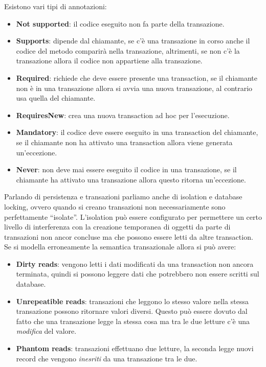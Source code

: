 Esistono vari tipi di annotazioni:
\begin{itemize}
      \item \textbf{Not supported}: il codice eseguito non fa parte della transazione.
      \item \textbf{Supports}: dipende dal chiamante, se c'è una transazione in
            corso anche il codice del metodo comparirà nella transazione, altrimenti,
            se non c'è la transazione allora il codice non appartiene alla transazione.
      \item \textbf{Required}: richiede che deve essere presente una transaction,
            se il chiamante non è in una transazione allora si avvia una nuova
            transazione, al contrario usa quella del chiamante.
      \item \textbf{RequiresNew}: crea una nuova transaction ad hoc per l'esecuzione.
      \item \textbf{Mandatory}: il codice deve essere eseguito in una transaction
            del chiamante, se il chiamante non ha attivato una transaction allora
            viene generata un'eccezione.
      \item \textbf{Never}: non deve mai essere eseguito il codice in una transazione,
            se il chiamante ha attivato una transazione allora questo ritorna
            un'eccezione.
\end{itemize}
Parlando di persistenza e transazioni parliamo anche di isolation e database
locking, ovvero quando si creano transazioni non necessariamente sono perfettamente
“isolate”. L'isolation può essere configurato per permettere un certo livello di
interferenza con la creazione temporanea di oggetti da parte di transazioni non
ancor concluse ma che possono essere letti da altre transaction. Se si modella
erroneamente la semantica transazionale allora si può avere:
\begin{itemize}
      \item \textbf{Dirty reads}: vengono letti i dati modificati da una transaction
            non ancora terminata, quindi si possono leggere dati che potrebbero
            non essere scritti sul database.
      \item \textbf{Unrepeatible reads}: transazioni che leggono lo stesso valore
            nella stessa transazione possono ritornare valori diversi. Questo
            può essere dovuto dal fatto che una transazione legge la stessa cosa
            ma tra le due letture c'è una \textit{modifica} del valore.
      \item \textbf{Phantom reads}: transazioni effettuano due letture, la seconda
            legge nuovi record che vengono \textit{inesriti} da una transazione
            tra le due.
\end{itemize}
